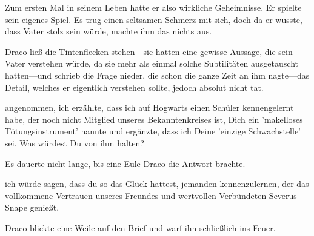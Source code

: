 Zum ersten Mal in seinem Leben hatte er also wirkliche Geheimnisse. Er spielte sein eigenes Spiel. Es trug einen seltsamen Schmerz mit sich, doch da er wusste, dass Vater stolz sein würde, machte ihm das nichts aus.

Draco ließ die Tintenflecken stehen—sie hatten eine gewisse Aussage, die sein Vater verstehen würde, da sie mehr als einmal solche Subtilitäten ausgetauscht hatten—und schrieb die Frage nieder, die schon die ganze Zeit an ihm nagte—das Detail, welches er eigentlich verstehen sollte, jedoch absolut nicht tat.

\begin{writtenNote}

angenommen, ich erzählte, dass ich auf Hogwarts einen Schüler kennengelernt habe, der noch nicht Mitglied unseres Bekanntenkreises ist, Dich ein 'makelloses Tötungsinstrument' nannte und ergänzte, dass ich Deine 'einzige Schwachstelle' sei. Was würdest Du von ihm halten?
\end{writtenNote}

Es dauerte nicht lange, bis eine Eule Draco die Antwort brachte.

\begin{writtenNote}

ich würde sagen, dass du so das Glück hattest, jemanden kennenzulernen, der das vollkommene Vertrauen unseres Freundes und wertvollen Verbündeten Severus Snape genießt.

\end{writtenNote}

Draco blickte eine Weile auf den Brief und warf ihn schließlich ins Feuer.


